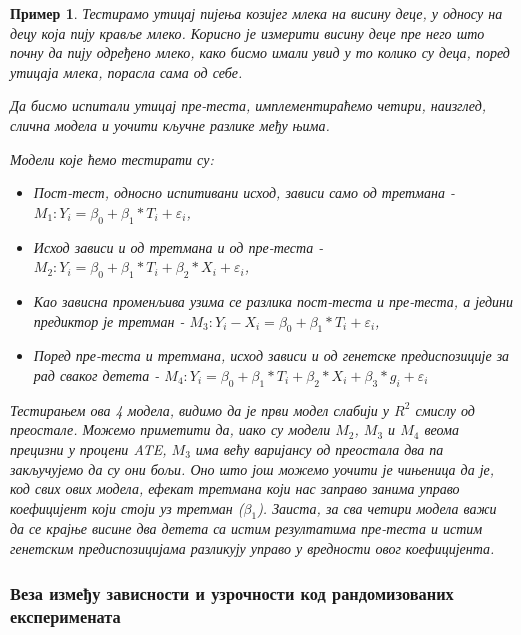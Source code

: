 \documentclass[12pt, a4paper]{article}
\newtheorem{primer}{Пример}[section]
\begin{document}
\begin{primer}
Тестирамо утицај пијења козијег млека на висину деце, у односу на децу која пију кравље млеко. Корисно је измерити 
висину деце пре него што почну да пију одређено млеко, како бисмо имали увид у то колико су деца, поред утицаја млека, порасла сама од себе. 

\par Да бисмо испитали утицај пре-теста, имплементираћемо четири, наизглед, слична модела и уочити кључне разлике међу њима.


Модели које ћемо тестирати су:
\begin{itemize}
    \item Пост-тест, односно испитивани исход, зависи само од третмана - $M_1: Y_i=\beta_0+\beta_1*T_i+\varepsilon_i$,
    \item Исход зависи и од третмана и од пре-теста - $M_2: Y_i=\beta_0+\beta_1*T_i+\beta_2*X_i+\varepsilon_i$,
    \item Као зависна променљива узима се разлика пост-теста и пре-теста, а једини предиктор је третман - $M_3: Y_i-X_i = \beta_0+\beta_1*T_i+\varepsilon_i$,
    \item Поред пре-теста и третмана, исход зависи и од генетске предиспозиције за рад сваког детета - $M_4: Y_i = \beta_0+\beta_1*T_i+\beta_2*X_i+\beta_3*g_i+\varepsilon_i$
\end{itemize}
Тестирањем ова 4 модела, видимо да је први модел слабији у $R^2$ смислу од преостале. Можемо приметити да, иако су модели $M_2$, $M_3$ и $M_4$ веома прецизни у процени ATE, $M_3$ има већу варијансу од преостала два па закључујемо да су они бољи. Оно што још можемо уочити је чињеница да је, код свих ових модела, ефекат 
третмана који нас заправо занима управо коефицијент који стоји уз третман ($\beta_1$). Заиста, за 
сва четири модела важи да се крајње висине два детета са истим резултатима пре-теста и истим 
генетским предиспозицијама разликују управо у вредности овог коефицијента.
\end{primer}

\subsubsection{Веза између зависности и узрочности код рандомизованих експеримената}
\end{document}
